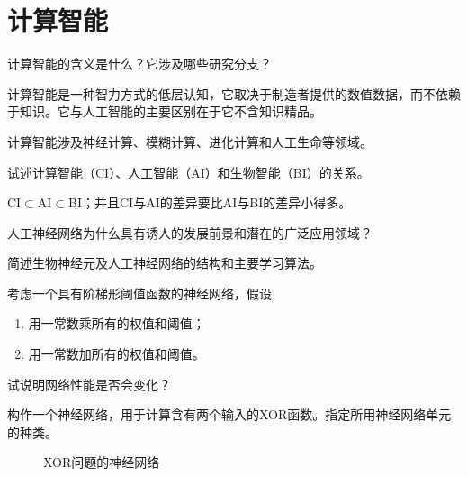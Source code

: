 \chapter{计算智能}

\begin{question}
计算智能的含义是什么？它涉及哪些研究分支？
\end{question}
\begin{solution}
计算智能是一种智力方式的低层认知，它取决于制造者提供的数值数据，而不依赖于知识。它与人工智能的主要区别在于它不含知识精品。\par
计算智能涉及神经计算、模糊计算、进化计算和人工生命等领域。
\end{solution}

\begin{question}
试述计算智能（CI）、人工智能（AI）和生物智能（BI）的关系。
\end{question}
\begin{solution}
CI$\subset$AI$\subset$BI；并且CI与AI的差异要比AI与BI的差异小得多。
\end{solution}

\begin{question}
人工神经网络为什么具有诱人的发展前景和潜在的广泛应用领域？
\end{question}
\begin{solution}
\end{solution}

\begin{question}
简述生物神经元及人工神经网络的结构和主要学习算法。
\end{question}
\begin{solution}
\end{solution}

\begin{question}
考虑一个具有阶梯形阈值函数的神经网络，假设
	\begin{enumerate}
		\item 用一常数乘所有的权值和阈值；
		\item 用一常数加所有的权值和阈值。
	\end{enumerate}
试说明网络性能是否会变化？
\end{question}
\begin{solution}
\end{solution}

\begin{question}
构作一个神经网络，用于计算含有两个输入的XOR函数。指定所用神经网络单元的种类。
\end{question}
\begin{solution}
	\begin{figure}[h]
		\centering
		
		\caption{XOR问题的神经网络} \label{Fig:NN-XOR}
	\end{figure}
\end{solution}

